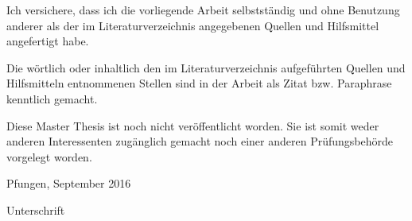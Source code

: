 \documentclass[../../main.tex]{subfiles}
\begin{document}
Ich versichere, dass ich die vorliegende Arbeit selbstständig und ohne Benutzung anderer als der im Literaturverzeichnis angegebenen Quellen und Hilfsmittel angefertigt habe.

Die wörtlich oder inhaltlich den im Literaturverzeichnis aufgeführten Quellen und Hilfsmitteln entnommenen Stellen sind in der Arbeit als Zitat bzw. Paraphrase kenntlich gemacht.

Diese Master Thesis ist noch nicht veröffentlicht worden. Sie ist somit weder anderen Interessenten zugänglich gemacht noch einer anderen Prüfungsbehörde vorgelegt worden.

\vspace{1cm}


Pfungen, September 2016  

\vspace{1cm}


Unterschrift
\end{document}
